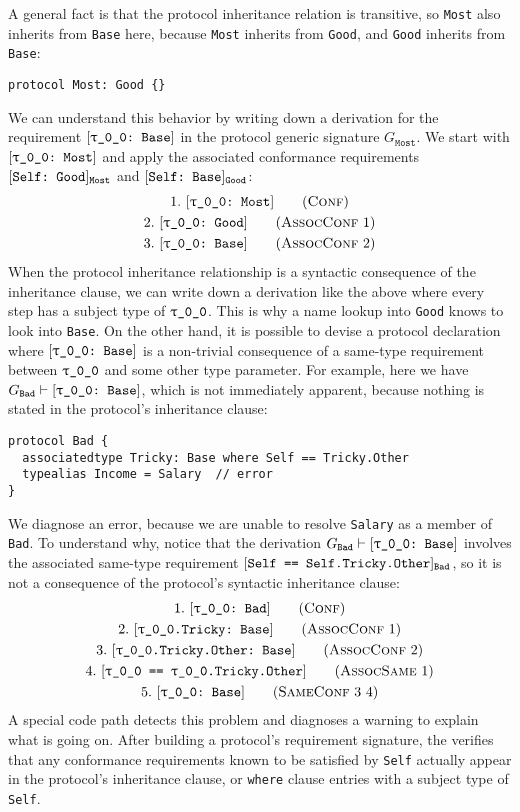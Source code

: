 \documentclass[../generics]{subfiles}
\begin{document}
A general fact is that the protocol inheritance relation is transitive, so \texttt{Most} also inherits from \texttt{Base} here, because \texttt{Most} inherits from \texttt{Good}, and \texttt{Good} inherits from \texttt{Base}:
\begin{Verbatim}
protocol Most: Good {}
\end{Verbatim}
We can understand this behavior by writing down a derivation for the requirement $[\texttt{\texttt{$\uptau$\_0\_0}:~Base}]$ in the protocol generic signature $G_\texttt{Most}$. We start with $[\texttt{\texttt{$\uptau$\_0\_0}:~Most}]$ and apply the associated conformance requirements $[\texttt{Self:~Good}]_{\texttt{Most}}$ and $[\texttt{Self:~Base}]_{\texttt{Good}}$:
\begin{gather*}
\ConfStep{\rT}{Most}{1}\\
\AssocConfStep{1}{\rT}{Good}{2}\\
\AssocConfStep{2}{\rT}{Base}{3}
\end{gather*}
When the protocol inheritance relationship is a syntactic consequence of the inheritance clause, we can write down a derivation like the above where every step has a subject type of $\texttt{$\uptau$\_0\_0}$. This is why a name lookup into \texttt{Good} knows to look into \texttt{Base}. On the other hand, it is possible to devise a protocol declaration where $[\texttt{\texttt{$\uptau$\_0\_0}:~Base}]$ is a non-trivial consequence of a same-type requirement between $\texttt{$\uptau$\_0\_0}$ and some other type parameter. For example, here we have $G_\texttt{Bad}\vdash[\texttt{\texttt{$\uptau$\_0\_0}:~Base}]$, which is not immediately apparent, because nothing is stated in the protocol's inheritance clause:
\begin{Verbatim}
protocol Bad {
  associatedtype Tricky: Base where Self == Tricky.Other
  typealias Income = Salary  // error
}
\end{Verbatim}
We diagnose an error, because we are unable to resolve \texttt{Salary} as a member of \texttt{Bad}. To understand why, notice that the derivation $G_\texttt{Bad} \vdash [\texttt{\texttt{$\uptau$\_0\_0}:~Base}]$ involves the associated same-type requirement $[\texttt{Self == Self.Tricky.Other}]_\texttt{Bad}$, so it is not a consequence of the protocol's syntactic inheritance clause:
\begin{gather*}
\ConfStep{\rT}{Bad}{1}\\
\AssocConfStep{1}{\rT.Tricky}{Base}{2}\\
\AssocConfStep{2}{\rT.Tricky.Other}{Base}{3}\\
\AssocSameStep{1}{\rT}{\rT.Tricky.Other}{4}\\
\SameConfStep{3}{4}{\rT}{Base}{5}
\end{gather*}
A special code path detects this problem and diagnoses a warning to explain what is going on. After building a protocol's requirement signature, the  verifies that any conformance requirements known to be satisfied by \texttt{Self} actually appear in the protocol's inheritance clause, or \texttt{where} clause entries with a subject type of \texttt{Self}.
\end{document}
